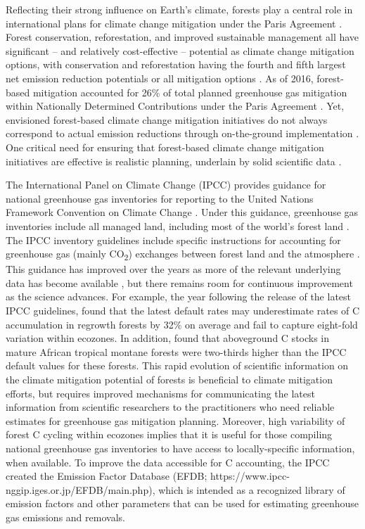 \documentclass[, manuscript]{copernicus}
\begin{document}
Reflecting their strong influence on Earth's climate, forests play a
central role in international plans for climate change mitigation under
the Paris Agreement \citep{unfccc_adoption_2015}. Forest conservation,
reforestation, and improved sustainable management all have significant
-- and relatively cost-effective -- potential as climate change
mitigation options, with conservation and reforestation having the
fourth and fifth largest net emission reduction potentials or all
mitigation options \citep{ipcc_summary_2022}. As of 2016, forest-based
mitigation accounted for 26\% of total planned greenhouse gas mitigation
within Nationally Determined Contributions under the Paris Agreement
\citep{grassi_key_2017}. Yet, envisioned forest-based climate change
mitigation initiatives do not always correspond to actual emission
reductions through on-the-ground implementation \citep{refs}. One
critical need for ensuring that forest-based climate change mitigation
initiatives are effective is realistic planning, underlain by solid
scientific data \citep{anderson-teixeira_effective_2022}.

The International Panel on Climate Change (IPCC) provides guidance for
national greenhouse gas inventories for reporting to the United Nations
Framework Convention on Climate Change
\citep[UNFCCC,][]{ipcc_2019_2019}. Under this guidance, greenhouse gas
inventories include all managed land, including most of the world's
forest land \citep{ogle_delineating_2018}. The IPCC inventory guidelines
include specific instructions for accounting for greenhouse gas (mainly
CO\textsubscript{2}) exchanges between forest land and the atmosphere
\citep{ipcc_agriculture_2006, ipcc_2019_2019}. This guidance has
improved over the years as more of the relevant underlying data has
become available
\citep{requenasuarez_estimating_2019, rozendaal_aboveground_2022}, but
there remains room for continuous improvement as the science advances.
For example, the year following the release of the latest IPCC
guidelines, \citet{cook-patton_mapping_2020} found that the latest
default rates may underestimate rates of C accumulation in regrowth
forests by 32\% on average and fail to capture eight-fold variation
within ecozones. In addition, \citet{cuni-sanchez_high_2021} found that
aboveground C stocks in mature African tropical montane forests were
two-thirds higher than the IPCC default values for these forests. This
rapid evolution of scientific information on the climate mitigation
potential of forests is beneficial to climate mitigation efforts, but
requires improved mechanisms for communicating the latest information
from scientific researchers to the practitioners who need reliable
estimates for greenhouse gas mitigation planning. Moreover, high
variability of forest C cycling within ecozones
\citep[e.g.,][]{cook-patton_mapping_2020, refs} implies that it is
useful for those compiling national greenhouse gas inventories to have
access to locally-specific information, when available. To improve the
data accessible for C accounting, the IPCC created the Emission Factor
Database (EFDB; https://www.ipcc-nggip.iges.or.jp/EFDB/main.php), which
is intended as a recognized library of emission factors and other
parameters that can be used for estimating greenhouse gas emissions and
removals.
\end{document}
